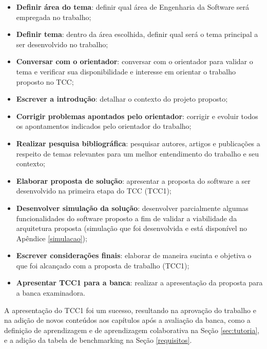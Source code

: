 \begin{itemize}

\item \textbf{Definir área do tema}: definir qual área de Engenharia da Software será empregada no trabalho;

\item \textbf{Definir tema}: dentro da área escolhida, definir qual será o tema principal a ser desenvolvido no trabalho;

\item \textbf{Conversar com o orientador}: conversar com o orientador para validar o tema e verificar sua disponibilidade e interesse em orientar o trabalho proposto no TCC;

\item \textbf{Escrever a introdução}: detalhar o contexto do projeto proposto;

\item \textbf{Corrigir problemas apontados pelo orientador}: corrigir e evoluir todos os apontamentos indicados pelo orientador do trabalho;

\item \textbf{Realizar pesquisa bibliográfica}: pesquisar autores, artigos e publicações a respeito de temas relevantes para um melhor entendimento do trabalho e seu contexto;

\item \textbf{Elaborar proposta de solução}: apresentar a proposta do software a ser desenvolvido na primeira etapa do TCC (TCC1);

\item \textbf{Desenvolver simulação da solução}: desenvolver parcialmente algumas funcionalidades do software proposto a fim de validar a viabilidade da arquitetura proposta (simulação que foi desenvolvida e está disponível no Apêndice \ref{simulacao});

\item \textbf{Escrever considerações finais}: elaborar de maneira sucinta e objetiva o que foi alcançado com a proposta de trabalho (TCC1);

\item \textbf{Apresentar TCC1 para a banca}: realizar a apresentação da proposta para a banca examinadora.

\end{itemize}

A apresentação do TCC1 foi um sucesso, resultando na aprovação do trabalho e na adição de novos conteúdos aos capítulos após a avaliação da banca, como a definição de aprendizagem e de aprendizagem colaborativa na Seção \ref{sec:tutoria}, e a adição da tabela de benchmarking na Seção \ref{requisitos}.

